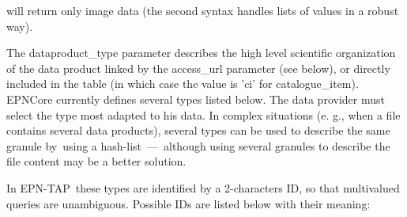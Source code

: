 \documentclass[11pt,a4paper]{ivoa}
\begin{document}
will return only image data (the second syntax handles lists of values in a robust way).

The dataproduct\_type parameter describes the high level scientific organization of the data product linked by the access\_url parameter (see below), or directly included in the table (in which case the value is 'ci' for catalogue\_item). EPNCore currently defines several types listed below. The data provider must select the type most adapted to his data. In complex situations (e. g., when a file contains several data products), several types can be used to describe the same granule by using a hash-list — although using several granules to describe the file content may be a better solution.  

In EPN-TAP these types are identified by a 2-characters ID, so that multivalued queries are unambiguous. Possible IDs are listed below with their meaning:
\end{document}
